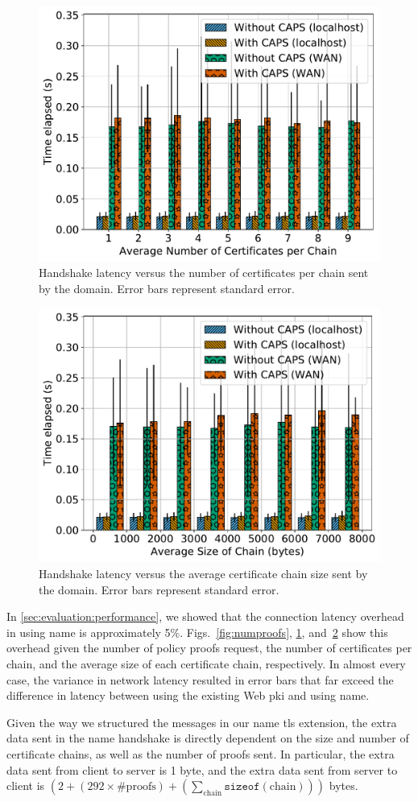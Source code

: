 \begin{figure}[t]
  \centering
  \includegraphics[width=0.8\linewidth]{fig/eval_tls_ext/2-time_elapsed_vs_num_certs_per_chain}
  \caption{Handshake latency versus the number of certificates per chain sent by the
  domain. Error bars represent standard error.}
  \label{fig:numcerts}
\end{figure}

\begin{figure}[t]
  \centering
  \includegraphics[width=0.8\linewidth]{fig/eval_tls_ext/3-time_elapsed_vs_avg_chain_size}
  \caption{Handshake latency versus the average certificate chain size sent by the
  domain. Error bars represent standard error.}
  \label{fig:chainsize}
\end{figure}

In \autoref{sec:evaluation:performance}, we showed that the connection latency
overhead in using \ac{name} is approximately 5\%. Figs.~\ref{fig:numproofs},
\ref{fig:numcerts}, and~\ref{fig:chainsize} show this overhead given the number
of policy proofs request, the number of certificates per chain, and the average
size of each certificate chain, respectively. In almost every case, the variance
in network latency resulted in error bars that far exceed the difference in
latency between using the existing Web \ac{pki} and using \ac{name}.

Given the way we structured the messages in our \ac{name} \ac{tls} extension,
the extra data sent in the \ac{name} handshake is directly dependent on the size
and number of certificate chains, as well as the number of proofs sent. In
particular, the extra data sent from client to server is 1 byte, and the extra
data sent from server to client is $(2 + (292 \times \text{\#proofs}) +
(\sum_{\text{chain}}\texttt{sizeof}(\text{chain})))$ bytes. 
